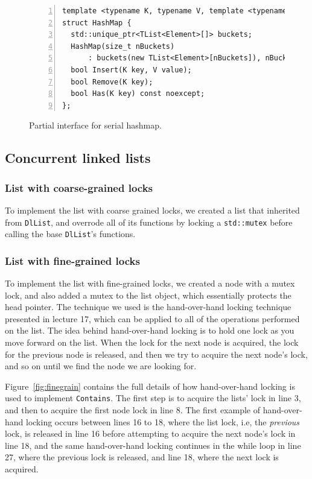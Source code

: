 \documentclass[11pt]{article}
\begin{document}
\begin{figure}
\begin{center}
\begin{lstlisting}[numbers=left]
template <typename K, typename V, template <typename> class TList>
struct HashMap {
  std::unique_ptr<TList<Element>[]> buckets;
  HashMap(size_t nBuckets)
      : buckets(new TList<Element>[nBuckets]), nBuckets(nBuckets) {}
  bool Insert(K key, V value);
  bool Remove(K key);
  bool Has(K key) const noexcept;
};
\end{lstlisting}
\caption{Partial interface for serial hashmap.}
\label{fig:hashmap}
\end{center}
\end{figure}

\subsection{Concurrent linked lists}

\subsubsection{List with coarse-grained locks}
To implement the list with coarse grained locks, we created a list that
inherited from {\tt DlList}, and overrode all of its functions by locking a
{\tt std::mutex} before calling the base {\tt DlList}'s functions.

\subsubsection{List with fine-grained locks}
To implement the list with fine-grained locks, we created a node with a mutex
lock, and also added a mutex to the list object, which essentially protects the
head pointer. The technique we used is the hand-over-hand locking technique
presented in lecture 17, which can be applied to all of the operations performed
on the list. The idea behind hand-over-hand locking is to hold one lock as you
move forward on the list. When the lock for the next node is acquired, the lock
for the previous node is released, and then we try to acquire the next node's
lock, and so on until we find the node we are looking for.

Figure~\ref{fig:finegrain} contains the full details of how hand-over-hand
locking is used to implement {\tt Contains}. The first step is to acquire the
lists' lock in line 3, and then to acquire the first node lock in line 8. The
first example of hand-over-hand locking occurs between lines 16 to 18, where the
list lock, i.e, the {\it previous} lock, is released in line 16 before
attempting to acquire the next node's lock in line 18, and the same
hand-over-hand locking continues in the while loop in line 27, where the
previous lock is released, and line 18, where the next lock is acquired.
\end{document}
